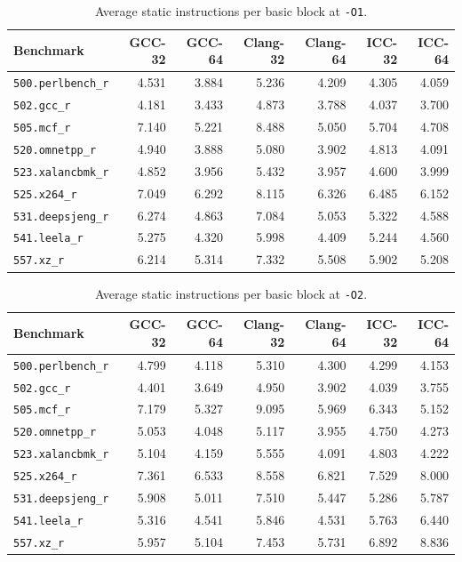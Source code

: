\documentclass[11pt,a4paper]{article}
\newcommand{\bench}[1]{\texttt{#1}}
\begin{document}
\begin{table}[H]
\centering
\caption{Average static instructions per basic block at \texttt{-O1}.}
\label{tab:bbO1}
\begin{tabular}{lrrrrrr}
\toprule
Benchmark & GCC-32 & GCC-64 & Clang-32 & Clang-64 & ICC-32 & ICC-64 \\
\midrule
\bench{500.perlbench\_r} & 4.531 & 3.884 & 5.236 & 4.209 & 4.305 & 4.059 \\
\bench{502.gcc\_r} & 4.181 & 3.433 & 4.873 & 3.788 & 4.037 & 3.700 \\
\bench{505.mcf\_r} & 7.140 & 5.221 & 8.488 & 5.050 & 5.704 & 4.708 \\
\bench{520.omnetpp\_r} & 4.940 & 3.888 & 5.080 & 3.902 & 4.813 & 4.091 \\
\bench{523.xalancbmk\_r} & 4.852 & 3.956 & 5.432 & 3.957 & 4.600 & 3.999 \\
\bench{525.x264\_r} & 7.049 & 6.292 & 8.115 & 6.326 & 6.485 & 6.152 \\
\bench{531.deepsjeng\_r} & 6.274 & 4.863 & 7.084 & 5.053 & 5.322 & 4.588 \\
\bench{541.leela\_r} & 5.275 & 4.320 & 5.998 & 4.409 & 5.244 & 4.560 \\
\bench{557.xz\_r} & 6.214 & 5.314 & 7.332 & 5.508 & 5.902 & 5.208 \\
\bottomrule
\end{tabular}
\end{table}
 
\begin{table}[H]
\centering
\caption{Average static instructions per basic block at \texttt{-O2}.}
\label{tab:bbO2}
\begin{tabular}{lrrrrrr}
\toprule
Benchmark & GCC-32 & GCC-64 & Clang-32 & Clang-64 & ICC-32 & ICC-64 \\
\midrule
\bench{500.perlbench\_r} & 4.799 & 4.118 & 5.310 & 4.300 & 4.299 & 4.153 \\
\bench{502.gcc\_r} & 4.401 & 3.649 & 4.950 & 3.902 & 4.039 & 3.755 \\
\bench{505.mcf\_r} & 7.179 & 5.327 & 9.095 & 5.969 & 6.343 & 5.152 \\
\bench{520.omnetpp\_r} & 5.053 & 4.048 & 5.117 & 3.955 & 4.750 & 4.273 \\
\bench{523.xalancbmk\_r} & 5.104 & 4.159 & 5.555 & 4.091 & 4.803 & 4.222 \\
\bench{525.x264\_r} & 7.361 & 6.533 & 8.558 & 6.821 & 7.529 & 8.000 \\
\bench{531.deepsjeng\_r} & 5.908 & 5.011 & 7.510 & 5.447 & 5.286 & 5.787 \\
\bench{541.leela\_r} & 5.316 & 4.541 & 5.846 & 4.531 & 5.763 & 6.440 \\
\bench{557.xz\_r} & 5.957 & 5.104 & 7.453 & 5.731 & 6.892 & 8.836 \\
\bottomrule
\end{tabular}
\end{table}
 
\end{document}
